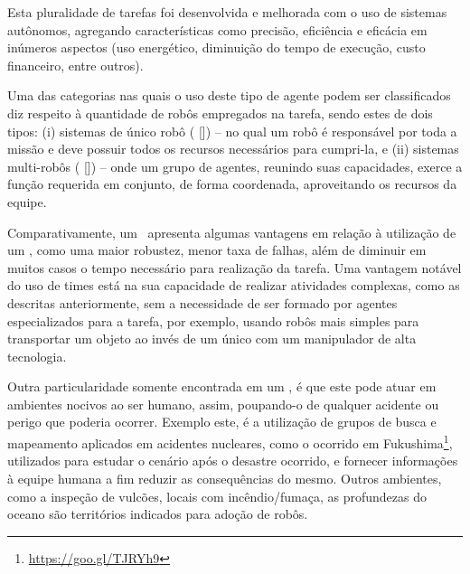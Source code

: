 

Esta pluralidade de tarefas foi desenvolvida e melhorada com o uso de sistemas autônomos, agregando características como precisão, eficiência e eficácia em inúmeros aspectos (uso energético, diminuição do tempo de execução, custo financeiro, entre outros).

Uma das categorias nas quais o uso deste tipo de agente podem ser classificados diz respeito à quantidade de robôs empregados na tarefa, sendo estes de dois tipos: (i) sistemas de único robô ( []) -- no qual um robô é responsável por toda a missão e deve possuir todos os recursos necessários para cumpri-la, e (ii) sistemas multi-robôs ( []) -- onde um grupo de agentes, reunindo suas capacidades, exerce a função requerida em conjunto, de forma coordenada, aproveitando os recursos da equipe.

Comparativamente, um \ apresenta algumas vantagens em relação à utilização de um , como uma maior robustez, menor taxa de falhas, além de diminuir em muitos casos o tempo necessário para realização da tarefa.
Uma vantagem notável do uso de times está na sua capacidade de realizar atividades complexas, como as descritas anteriormente, sem a necessidade de ser formado por agentes especializados para a tarefa, por exemplo, usando robôs mais simples para transportar um objeto ao invés de um único com um manipulador de alta tecnologia.

Outra particularidade somente encontrada em um , é que este pode atuar em ambientes nocivos ao ser humano, assim, poupando-o de qualquer acidente ou perigo que poderia ocorrer.
Exemplo este, é a utilização de grupos de busca e mapeamento aplicados em acidentes nucleares, como o ocorrido em Fukushima\footnote{\url{https://goo.gl/TJRYh9}}, utilizados para estudar o cenário após o desastre ocorrido, e fornecer informações à equipe humana a fim reduzir as consequências do mesmo.
Outros ambientes, como a inspeção de vulcões, locais com incêndio/fumaça, as profundezas do oceano são territórios indicados para adoção de robôs.

